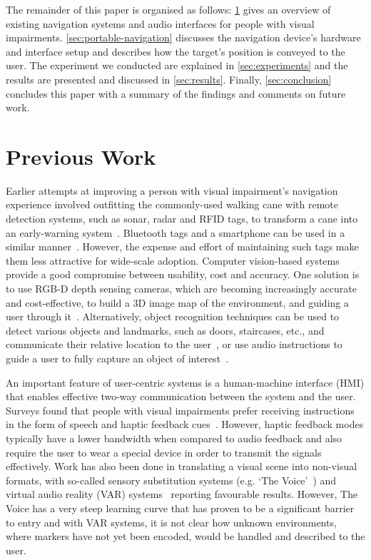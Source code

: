 \documentclass{llncs}
\begin{document}
The remainder of this paper is organised as follows: \cref{sec:lit-review} gives an overview of existing navigation systems and audio interfaces for people with visual impairments.
\cref{sec:portable-navigation} discusses the navigation device's hardware and interface setup and describes how the target's position is conveyed to the user.
The experiment we conducted are explained in \cref{sec:experiments} and the results are presented and discussed in \cref{sec:results}. 
Finally, \cref{sec:conclusion} concludes this paper with a summary of the findings and comments on future work. 

\section{Previous Work}\label{sec:lit-review}

Earlier attempts at improving a person with visual impairment's navigation experience involved outfitting the commonly-used walking cane with remote detection systems, such as sonar, radar and RFID tags, to transform a cane into an early-warning system~\cite{ulrich1997,marion2008batcane,faria2010electronic,willis2005}.
Bluetooth tags and a smartphone can be used in a similar manner~\cite{sato2017navcog3}.
However, the expense and effort of maintaining such tags make them less attractive for wide-scale adoption.
Computer vision-based systems provide a good compromise between usability, cost and accuracy.
One solution is to use RGB-D depth sensing cameras, which are becoming increasingly accurate and cost-effective, to build a 3D image map of the environment, and guiding a user through it~\cite{lee2015,rodriguez2012obstacle}.
Alternatively, object recognition techniques can be used to detect various objects and landmarks, such as doors, staircases, etc., and communicate their relative location to the user~\cite{schauerte2012assistive,tian2013b,fiannaca2014headlock}, or use audio instructions to guide a user to fully capture an object of interest~\cite{vazquez2012helping}. 

An important feature of user-centric systems is a human-machine interface (HMI) that enables effective two-way communication between the system and the user.
Surveys found that people with visual impairments prefer receiving instructions in the form of speech and haptic feedback cues~\cite{khoo2016multimodal,ross2000wearable,vazquez2012helping}.
However, haptic feedback modes typically have a lower bandwidth when compared to audio feedback and also require the user to wear a special device in order to transmit the signals effectively.
Work has also been done in translating a visual scene into non-visual formats, with so-called sensory substitution systems (e.g. `The Voice'~\cite{meijer2010}) and virtual audio reality (VAR) systems~\cite{frauenberger2003} reporting favourable results.
However, The Voice has a very steep learning curve that has proven to be a significant barrier to entry and with VAR systems, it is not clear how unknown environments, where markers have not yet been encoded, would be handled and described to the user. 
\end{document}
